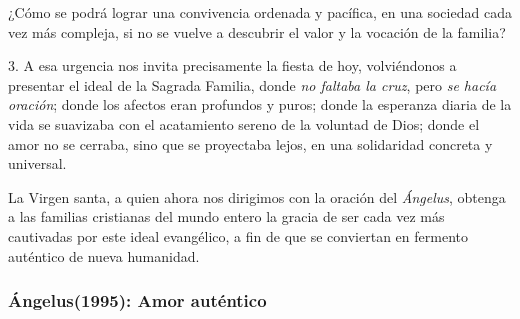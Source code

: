 \begin{body}
					¿Cómo se podrá lograr una convivencia ordenada y pacífica, en una sociedad cada vez más compleja, si no se vuelve a descubrir el valor y la vocación de la familia?
					
					3. A esa urgencia nos invita precisamente la fiesta de hoy, volviéndonos a presentar el ideal de la Sagrada Familia, donde \emph{no faltaba la cruz}, pero \emph{se hacía oración}; donde los afectos eran profundos y puros; donde la esperanza diaria de la vida se suavizaba con el acatamiento sereno de la voluntad de Dios; donde el amor no se cerraba, sino que se proyectaba lejos, en una solidaridad concreta y universal.
					
					La Virgen santa, a quien ahora nos dirigimos con la oración del \emph{Ángelus}, obtenga a las familias cristianas del mundo entero la gracia de ser cada vez más cautivadas por este ideal evangélico, a fin de que se conviertan en fermento auténtico de nueva humanidad.
				\end{body}
			
			\subsubsection{Ángelus(1995): Amor auténtico}
			
				
